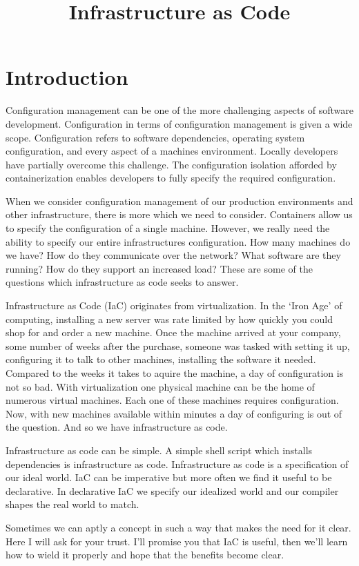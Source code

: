 \title{Infrastructure as Code}
\maketitle

\section{Introduction}
Configuration management can be one of the more challenging aspects of software development.
Configuration in terms of configuration management is given a wide scope.
Configuration refers to software dependencies, operating system configuration, and every aspect of a machines environment.
Locally developers have partially overcome this challenge.
The configuration isolation afforded by containerization enables developers to fully specify the required configuration.

When we consider configuration management of our production environments and other infrastructure,
there is more which we need to consider.
Containers allow us to specify the configuration of a single machine.
However, we really need the ability to specify our entire infrastructures configuration.
How many machines do we have?
How do they communicate over the network?
What software are they running?
How do they support an increased load?
These are some of the questions which infrastructure as code seeks to answer.

Infrastructure as Code (IaC) originates from virtualization.
In the `Iron Age' of computing, installing a new server was rate limited by how quickly you could shop for and order a new machine.
Once the machine arrived at your company, some number of weeks after the purchase,
someone was tasked with setting it up, configuring it to talk to other machines, installing the software it needed.
Compared to the weeks it takes to aquire the machine, a day of configuration is not so bad.
With virtualization one physical machine can be the home of numerous virtual machines.
Each one of these machines requires configuration.
Now, with new machines available within minutes a day of configuring is out of the question.
And so we have infrastructure as code.

Infrastructure as code can be simple.
A simple shell script which installs dependencies is infrastructure as code.
Infrastructure as code is a specification of our ideal world.
IaC can be imperative but more often we find it useful to be declarative.
In declarative IaC we specify our idealized world and our compiler shapes the real world to match.

Sometimes we can aptly a concept in such a way that makes the need for it clear.
Here I will ask for your trust.
I'll promise you that IaC is useful,
then we'll learn how to wield it properly and hope that the benefits become clear.
